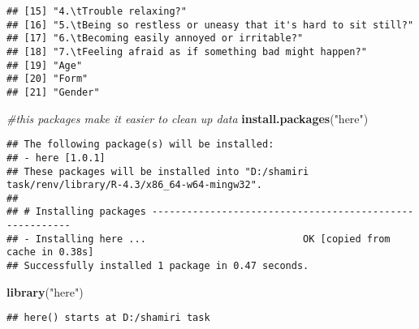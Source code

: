 \documentclass[
]{article}
\newenvironment{Shaded}{\begin{snugshade}}{\end{snugshade}}
\newcommand{\CommentTok}[1]{\textcolor[rgb]{0.56,0.35,0.01}{\textit{#1}}}
\newcommand{\FunctionTok}[1]{\textcolor[rgb]{0.13,0.29,0.53}{\textbf{#1}}}
\newcommand{\NormalTok}[1]{#1}
\newcommand{\StringTok}[1]{\textcolor[rgb]{0.31,0.60,0.02}{#1}}
\begin{document}
\begin{verbatim}
## [15] "4.\tTrouble relaxing?"                                                                                                                                                         
## [16] "5.\tBeing so restless or uneasy that it's hard to sit still?"                                                                                                                  
## [17] "6.\tBecoming easily annoyed or irritable?"                                                                                                                                     
## [18] "7.\tFeeling afraid as if something bad might happen?"                                                                                                                          
## [19] "Age"                                                                                                                                                                           
## [20] "Form"                                                                                                                                                                          
## [21] "Gender"
\end{verbatim}

\begin{Shaded}
\begin{Highlighting}[]
\CommentTok{\#this packages make it easier to clean up data}
\FunctionTok{install.packages}\NormalTok{(}\StringTok{"here"}\NormalTok{)}
\end{Highlighting}
\end{Shaded}

\begin{verbatim}
## The following package(s) will be installed:
## - here [1.0.1]
## These packages will be installed into "D:/shamiri task/renv/library/R-4.3/x86_64-w64-mingw32".
## 
## # Installing packages --------------------------------------------------------
## - Installing here ...                           OK [copied from cache in 0.38s]
## Successfully installed 1 package in 0.47 seconds.
\end{verbatim}

\begin{Shaded}
\begin{Highlighting}[]
\FunctionTok{library}\NormalTok{(}\StringTok{"here"}\NormalTok{)}
\end{Highlighting}
\end{Shaded}

\begin{verbatim}
## here() starts at D:/shamiri task
\end{verbatim}
\end{document}
